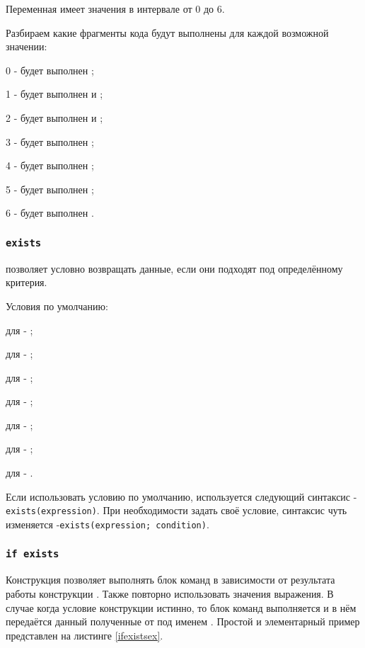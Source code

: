 Переменная  имеет значения в интервале от 0 до 6.

Разбираем какие фрагменты кода будут выполнены для каждой возможной значении:
\begin{icItems}
	\item 0 - будет выполнен ;
	\item 1 - будет выполнен  и ;
	\item 2 - будет выполнен  и ;
	\item 3 - будет выполнен ;
	\item 4 - будет выполнен ;
	\item 5 - будет выполнен ;
	\item 6 - будет выполнен .
\end{icItems}

\subsubsection{\lstinline|exists|}

 позволяет условно возвращать данные, если они подходят под определённому критерия.

Условия по умолчанию:
\begin{icItems}
\item
	для \bool{} - ;
\item
	для \integer{} - ;
\item
	для \double{} - ;
\item
	для \str{} - ;
\item
	для \listtype{} - ;
\item
	для \set{} - ;
\item
	для \element{} - .
\end{icItems}

Если использовать условию по умолчанию, используется следующий синтаксис - \lstinline|exists(expression)|.
При необходимости задать своё условие, синтаксис чуть изменяется -\lstinline|exists(expression; condition)|.

\subsubsection{\lstinline|if exists|}

Конструкция  позволяет выполнять блок команд в зависимости от результата работы конструкции . Также повторно использовать значения выражения. В случае когда условие конструкции  истинно, то блок команд выполняется и в нём передаётся данный полученные от  под именем .
Простой и элементарный пример представлен на листинге \ref{ifexistsex}.

